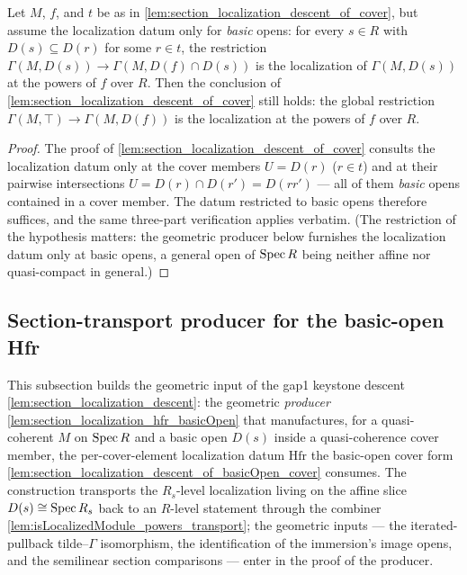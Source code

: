 
\begin{lemma}
  \label{lem:section_localization_descent_of_basicOpen_cover}
  \leanok
  Let \(M\), \(f\), and \(t\) be as in \cref{lem:section_localization_descent_of_cover},
  but assume the localization datum only for \emph{basic} opens: for every \(s \in R\)
  with \(D(s) \subseteq D(r)\) for some \(r \in t\), the restriction
  \(\Gamma(M, D(s)) \to \Gamma(M, D(f) \cap D(s))\) is the localization of
  \(\Gamma(M, D(s))\) at the powers of \(f\) over \(R\). Then the conclusion of
  \cref{lem:section_localization_descent_of_cover} still holds: the global restriction
  \(\Gamma(M, \top) \to \Gamma(M, D(f))\) is the localization at the powers of \(f\)
  over \(R\).
\end{lemma}
\begin{proof}
  \leanok
  The proof of \cref{lem:section_localization_descent_of_cover} consults the
  localization datum only at the cover members \(U = D(r)\) (\(r \in t\)) and at their
  pairwise intersections \(U = D(r) \cap D(r') = D(r r')\) — all of them \emph{basic}
  opens contained in a cover member. The datum restricted to basic opens therefore
  suffices, and the same three-part verification applies verbatim. (The restriction of
  the hypothesis matters: the geometric producer below furnishes the localization datum
  only at basic opens, a general open of \(\operatorname{Spec} R\) being neither affine nor
  quasi-compact in general.)
\end{proof}


\subsection{Section-transport producer for the basic-open Hfr}

This subsection builds the geometric input of the gap1 keystone descent
\cref{lem:section_localization_descent}: the geometric \emph{producer}
\cref{lem:section_localization_hfr_basicOpen} that manufactures, for a quasi-coherent \(M\) on
\(\operatorname{Spec} R\) and a basic open \(D(s)\) inside a quasi-coherence cover member, the per-cover-element
localization datum \(\mathrm{Hfr}\) the basic-open cover form
\cref{lem:section_localization_descent_of_basicOpen_cover} consumes. The construction transports the
\(R_s\)-level localization living on the affine slice \(D(s) \cong \operatorname{Spec} R_s\) back to an
\(R\)-level statement through the combiner \cref{lem:isLocalizedModule_powers_transport}; the
geometric inputs --- the iterated-pullback tilde--\(\Gamma\) isomorphism, the identification of the
immersion's image opens, and the semilinear section comparisons --- enter in the proof of the
producer.

